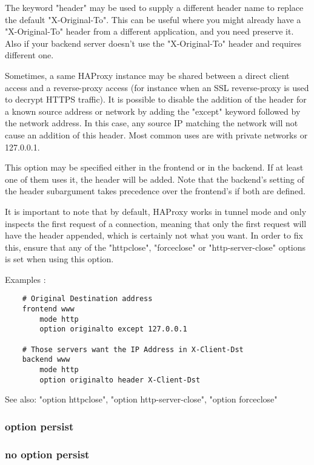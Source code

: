   The keyword "header" may be used to supply a different header name to replace
  the default "X-Original-To". This can be useful where you might already
  have a "X-Original-To" header from a different application, and you need
  preserve it. Also if your backend server doesn't use the "X-Original-To"
  header and requires different one.

  Sometimes, a same HAProxy instance may be shared between a direct client
  access and a reverse-proxy access (for instance when an SSL reverse-proxy is
  used to decrypt HTTPS traffic). It is possible to disable the addition of the
  header for a known source address or network by adding the "except" keyword
  followed by the network address. In this case, any source IP matching the
  network will not cause an addition of this header. Most common uses are with
  private networks or 127.0.0.1.

  This option may be specified either in the frontend or in the backend. If at
  least one of them uses it, the header will be added. Note that the backend's
  setting of the header subargument takes precedence over the frontend's if
  both are defined.

  It is important to note that by default, HAProxy works in tunnel mode and
  only inspects the first request of a connection, meaning that only the first
  request will have the header appended, which is certainly not what you want.
  In order to fix this, ensure that any of the "httpclose", "forceclose" or
  "http-server-close" options is set when using this option.

  Examples :
\begin{verbatim}
    # Original Destination address
    frontend www
        mode http
        option originalto except 127.0.0.1

    # Those servers want the IP Address in X-Client-Dst
    backend www
        mode http
        option originalto header X-Client-Dst
\end{verbatim}

  See also: "option httpclose", "option http-server-close",
             "option forceclose"

\subsubsection{option persist}
\subsubsection{no option persist}

